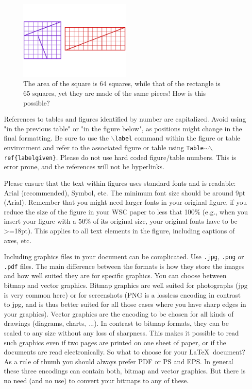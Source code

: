 \documentclass{wscpaperproc}
\theoremstyle{wsc}
\begin{document}
\begin{figure}[htb]
{
\centering
\includegraphics[width=0.50\textwidth]{puzzle}
\caption{The area of the square is 64 squares, while that of the rectangle is 65 squares, yet they are made of the same pieces! How
is this possible? \label{fig: rua}}
}
\end{figure}

References to tables and figures identified by number are capitalized. Avoid using "in the previous table" or "in the figure below", as positions might change in the final formatting. Be sure to use the {\tt $\backslash$label} command within the figure or table environment and refer to the associated figure or table using {\tt Table$\sim \backslash$ref\{labelgiven\}}.
Please do not use hard coded figure/table numbers. This is error prone, and the references will not be hyperlinks.

Please ensure that the text within figures uses standard fonts and is readable: Arial (recommended), Symbol, etc. The minimum font size should be around 9pt (Arial). Remember that you might need larger fonts in your original figure, if you reduce the size of the figure in your WSC paper to less that 100\% (e.g., when you insert your figure with a 50\% of its original size, your original fonts have to be >=18pt). This applies to all text elements in the figure, including captions of axes, etc. 

Including graphics files in your document can be complicated. 
Use {\tt .jpg}, {\tt .png} or {\tt .pdf} files.
The main difference between the formats is how they store the images and how well suited they are for specific graphics. You can choose between bitmap and vector graphics.
Bitmap graphics are well suited for photographs (jpg is very common here) or for screenshots (PNG is a lossless encoding in contrast to jpg, and is thus better suited for all those cases where you have sharp edges in your graphics).
Vector graphics are the encoding to be chosen for all kinds of drawings (diagrams, charts, ...). In contrast to bitmap formats, they can be scaled to any size without any loss of sharpness. This makes it possible to read such graphics even if two pages are printed on one sheet of paper, or if the documents are read electronically.
So what to choose for your \LaTeX\ document? As a rule of thumb you should always prefer PDF or PS and EPS.
In general these three encodings can contain both, bitmap and vector graphics. But there is no need (and no use) to convert your bitmaps to any of these.
\end{document}
